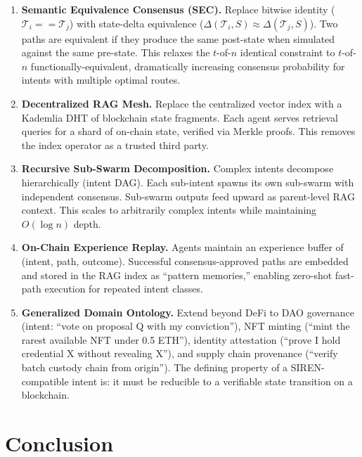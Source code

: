 \documentclass[11pt]{article}
\begin{document}
\begin{enumerate}
  \item \textbf{Semantic Equivalence Consensus (SEC).} Replace bitwise identity ($\mathcal{T}_i == \mathcal{T}_j$) with state-delta equivalence ($\Delta(\mathcal{T}_i, S) \approx \Delta(\mathcal{T}_j, S)$). Two paths are equivalent if they produce the same post-state when simulated against the same pre-state. This relaxes the $t$-of-$n$ identical constraint to $t$-of-$n$ functionally-equivalent, dramatically increasing consensus probability for intents with multiple optimal routes.
  \item \textbf{Decentralized RAG Mesh.} Replace the centralized vector index with a Kademlia DHT of blockchain state fragments. Each agent serves retrieval queries for a shard of on-chain state, verified via Merkle proofs. This removes the index operator as a trusted third party.
  \item \textbf{Recursive Sub-Swarm Decomposition.} Complex intents decompose hierarchically (intent DAG). Each sub-intent spawns its own sub-swarm with independent consensus. Sub-swarm outputs feed upward as parent-level RAG context. This scales to arbitrarily complex intents while maintaining $O(\log n)$ depth.
  \item \textbf{On-Chain Experience Replay.} Agents maintain an experience buffer of (intent, path, outcome). Successful consensus-approved paths are embedded and stored in the RAG index as ``pattern memories,'' enabling zero-shot fast-path execution for repeated intent classes.
  \item \textbf{Generalized Domain Ontology.} Extend beyond DeFi to DAO governance (intent: ``vote on proposal Q with my conviction''), NFT minting (``mint the rarest available NFT under 0.5 ETH''), identity attestation (``prove I hold credential X without revealing X''), and supply chain provenance (``verify batch custody chain from origin''). The defining property of a SIREN-compatible intent is: it must be reducible to a verifiable state transition on a blockchain.
\end{enumerate}

\section{Conclusion}
\label{sec:conclusion}
\end{document}
